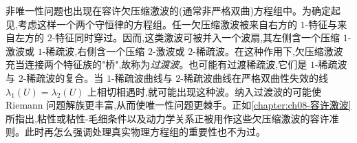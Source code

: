 \documentclass[../../main.tex]{subfiles}
\begin{document}
非唯一性问题也出现在容许欠压缩激波的(通常非严格双曲)方程组中。为确定起见,考虑这样一个两个守恒律的方程组。任一欠压缩激波被来自右方的 $1$-特征与来自左方的 $2$-特征同时穿过。因而,这类激波可被并入一个波扇,其左侧含一个压缩 $1$-激波或 $1$-稀疏波,右侧含一个压缩 $2$-激波或 $2$-稀疏波。在这种作用下,欠压缩激波充当连接两个特征族的"桥",故称为\emph{过渡波}。也可能有过渡稀疏波,它们是 $1$-稀疏波与 $2$-稀疏波的复合。当 $1$-稀疏波曲线与 $2$-稀疏波曲线在严格双曲性失效的线 $\lambda_{1}(U)=\lambda_{2}(U)$ 上相切相遇时,就可能出现这种波。纳入过渡波的可能使 Riemann 问题解族更丰富,从而使唯一性问题更棘手。正如\cref{chapter:ch08-容许激波}所指出,粘性或粘性-毛细条件以及动力学关系正被用作这些欠压缩激波的容许准则。此时再怎么强调处理真实物理方程组的重要性也不为过。
\end{document}
